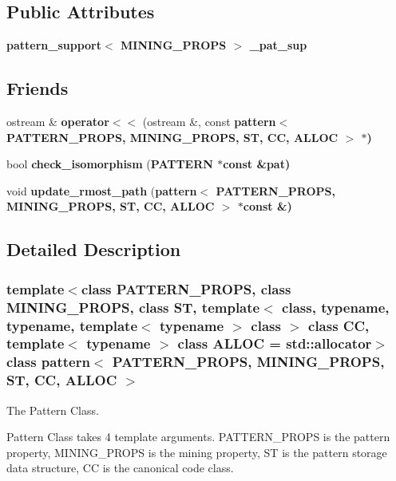\subsection*{Public Attributes}
\begin{CompactItemize}
\item 
\bf{pattern\_\-support}$<$ MINING\_\-PROPS $>$ \textbf{\_\-pat\_\-sup}\label{classpattern_d5eafd22562c013704eb561e4f865d7b}

\end{CompactItemize}
\subsection*{Friends}
\begin{CompactItemize}
\item 
ostream \& \textbf{operator$<$$<$} (ostream \&, const \bf{pattern}$<$ PATTERN\_\-PROPS, MINING\_\-PROPS, ST, CC, ALLOC $>$ $\ast$)\label{classpattern_f7c96c02881cf620fd15246480f6b87f}

\item 
bool \textbf{check\_\-isomorphism} (\bf{PATTERN} $\ast$const \&pat)\label{classpattern_0bf9e59f3e984736f037032ae33f8e31}

\item 
void \textbf{update\_\-rmost\_\-path} (\bf{pattern}$<$ PATTERN\_\-PROPS, MINING\_\-PROPS, ST, CC, ALLOC $>$ $\ast$const \&)\label{classpattern_2930f255b49d4f31a98c3dff6cc6cefc}

\end{CompactItemize}


\subsection{Detailed Description}
\subsubsection*{template$<$class PATTERN\_\-PROPS, class MINING\_\-PROPS, class ST, template$<$ class, typename, typename, template$<$ typename $>$ class $>$ class CC, template$<$ typename $>$ class ALLOC = std::allocator$>$ class pattern$<$ PATTERN\_\-PROPS, MINING\_\-PROPS, ST, CC, ALLOC $>$}

The Pattern Class. 

Pattern Class takes 4 template arguments. PATTERN\_\-PROPS is the pattern property, MINING\_\-PROPS is the mining property, ST is the pattern storage data structure, CC is the canonical code class. 



